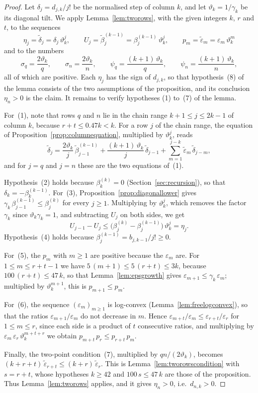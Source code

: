 \documentclass{amsart}
\theoremstyle{definition}
\theoremstyle{remark}
\numberwithin{equation}{section}
\begin{document}
\begin{proof}
Let $\delta_j=d_{j,k}/j!$ be the normalised step of column $k$, and let $\vartheta_k=1/\gamma_k$ be its diagonal tilt. We apply Lemma~\ref{lem:tworows}, with the given integers $k$, $r$ and $t$, to the sequences
\[
\eta_j=\tilde\delta_j=\delta_j\,\vartheta_k^{j},\qquad U_j=\tilde\beta^{(k-1)}_j=\beta^{(k-1)}_j\,\vartheta_k^{j},\qquad p_m=\tilde\varepsilon_m=\varepsilon_m\,\vartheta_k^{m}
\]
and to the numbers
\[
\sigma_q=\frac{2\vartheta_k}{q},\qquad\sigma_n=\frac{2\vartheta_k}{n},\qquad\psi_q=\frac{(k+1)\,\vartheta_k}{q},\qquad\psi_n=\frac{(k+1)\,\vartheta_k}{n},
\]
all of which are positive. Each $\eta_j$ has the sign of $d_{j,k}$, so that hypothesis~(8) of the lemma consists of the two assumptions of the proposition, and its conclusion $\eta_n>0$ is the claim. It remains to verify hypotheses (1) to~(7) of the lemma.

For~(1), note that rows $q$ and $n$ lie in the chain range $k+1\le j\le 2k-1$ of column $k$, because $r+t\le 0.47k<k$. For a row $j$ of the chain range, the equation of Proposition~\ref{prop:columnequation}, multiplied by $\vartheta_k^{j}$, reads
\[
\tilde\delta_j=\frac{2\vartheta_k}{j}\,\tilde\beta^{(k-1)}_{j-1}+\frac{(k+1)\,\vartheta_k}{j}\,\tilde\delta_{j-1}+\sum_{m=1}^{j-k}\tilde\varepsilon_m\,\tilde\delta_{j-m},
\]
and for $j=q$ and $j=n$ these are the two equations of~(1).

Hypothesis~(2) holds because $\beta^{(k)}_k=0$ (Section~\ref{sec:recursion}), so that $\delta_k=-\beta^{(k-1)}_k$. For~(3), Proposition~\ref{prop:diagonallower} gives $\gamma_k\,\beta^{(k-1)}_{j-1}\le\beta^{(k)}_j$ for every $j\ge 1$. Multiplying by $\vartheta_k^{j}$, which removes the factor $\gamma_k$ since $\vartheta_k\gamma_k=1$, and subtracting $U_j$ on both sides, we get
\[
U_{j-1}-U_j\le\bigl(\beta^{(k)}_j-\beta^{(k-1)}_j\bigr)\,\vartheta_k^{j}=\eta_j.
\]
Hypothesis~(4) holds because $\beta^{(k-1)}_j=b_{j,k-1}/j!\ge 0$.

For~(5), the $p_m$ with $m\ge 1$ are positive because the $\varepsilon_m$ are. For $1\le m\le r+t-1$ we have $5\,(m+1)\le 5\,(r+t)\le 3k$, because $100\,(r+t)\le 47\,k$, so that Lemma~\ref{lem:epsgrowth} gives $\varepsilon_{m+1}\le\gamma_k\,\varepsilon_m$; multiplied by $\vartheta_k^{m+1}$, this is $p_{m+1}\le p_m$.

For~(6), the sequence $(\varepsilon_m)_{m\ge 1}$ is log-convex (Lemma~\ref{lem:freelogconvex}), so that the ratios $\varepsilon_{m+1}/\varepsilon_m$ do not decrease in $m$. Hence $\varepsilon_{m+t}/\varepsilon_m\le\varepsilon_{r+t}/\varepsilon_r$ for $1\le m\le r$, since each side is a product of $t$ consecutive ratios, and multiplying by $\varepsilon_m\,\varepsilon_r\,\vartheta_k^{m+t+r}$ we obtain $p_{m+t}\,p_r\le p_{r+t}\,p_m$.

Finally, the two-point condition~(7), multiplied by $qn/(2\vartheta_k)$, becomes $(k+r+t)\,\tilde\varepsilon_{r+t}\le(k+r)\,\tilde\varepsilon_r$. This is Lemma~\ref{lem:tworowscondition} with $s=r+t$, whose hypotheses $k\ge 42$ and $100\,s\le 47\,k$ are those of the proposition. Thus Lemma~\ref{lem:tworows} applies, and it gives $\eta_n>0$, i.e.\ $d_{n,k}>0$.
\end{proof}
\end{document}
